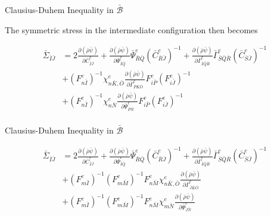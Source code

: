 \documentclass[11pt]{beamer}
\begin{document}
\begin{frame}{Clausius-Duhem Inequality in $\bar{\mathcal{B}}$}

The symmetric stress in the intermediate configuration then becomes

\begin{align*}
\bar{\Sigma}_{\bar{I}\bar{J}} &= 2\frac{\partial\left(\bar{\rho}\bar{\psi}\right)}{\partial \bar{C}_{\bar{I}\bar{J}}^e} + \frac{\partial\left(\bar{\rho}\bar{\psi}\right)}{\partial \bar{\Psi}_{\bar{I}\bar{Q}}^e}\bar{\Psi}_{\bar{R}\bar{Q}}^e \left(\bar{C}_{\bar{R}\bar{J}}^e\right)^{-1} + \frac{\partial\left(\bar{\rho}\bar{\psi}\right)}{\partial \bar{\Gamma}_{\bar{I}\bar{Q}\bar{R}}^e} \bar{\Gamma}_{\bar{S}\bar{Q}\bar{R}}^e \left(\bar{C}_{\bar{S}\bar{J}}^e\right)^{-1}\\
&  + \left(F_{n\bar{I}}^e\right)^{-1} \chi_{n\bar{K},\bar{O}}^e \frac{\partial \left(\bar{\rho}\bar{\psi}\right)}{\partial \bar{\Gamma}_{\bar{P}\bar{K}\bar{O}}^e} F_{i\bar{P}}^e \left(F_{i\bar{J}}^e\right)^{-1}\\
&+ \left(F_{n\bar{I}}^e\right)^{-1} \chi_{n\bar{N}}^e \frac{ \partial \left(\bar{\rho}\bar{\psi}\right)}{\partial \bar{\Psi}_{\bar{P}\bar{N}}^e} F_{i\bar{P}}^e \left(F_{i\bar{J}}^e\right)^{-1}\\
\end{align*}

\end{frame}

\begin{frame}{Clausius-Duhem Inequality in $\bar{\mathcal{B}}$}

\begin{align*}
\bar{\Sigma}_{\bar{I}\bar{J}} &= 2\frac{\partial\left(\bar{\rho}\bar{\psi}\right)}{\partial \bar{C}_{\bar{I}\bar{J}}^e} + \frac{\partial\left(\bar{\rho}\bar{\psi}\right)}{\partial \bar{\Psi}_{\bar{I}\bar{Q}}^e}\bar{\Psi}_{\bar{R}\bar{Q}}^e \left(\bar{C}_{\bar{R}\bar{J}}^e\right)^{-1} + \frac{\partial\left(\bar{\rho}\bar{\psi}\right)}{\partial \bar{\Gamma}_{\bar{I}\bar{Q}\bar{R}}^e} \bar{\Gamma}_{\bar{S}\bar{Q}\bar{R}}^e \left(\bar{C}_{\bar{S}\bar{J}}^e\right)^{-1}\\
&  + \left(F_{m\bar{I}}^e\right)^{-1} \left(F_{m\bar{M}}^e\right)^{-1} F_{n\bar{M}}^e\chi_{n\bar{K},\bar{O}}^e \frac{\partial \left(\bar{\rho}\bar{\psi}\right)}{\partial \bar{\Gamma}_{\bar{J}\bar{K}\bar{O}}^e}\\
&+ \left(F_{m\bar{I}}^e\right)^{-1}  \left(F_{m\bar{M}}^e\right)^{-1} F_{n\bar{M}}^e \chi_{m\bar{N}}^e \frac{ \partial \left(\bar{\rho}\bar{\psi}\right)}{\partial \bar{\Psi}_{\bar{J}\bar{N}}^e} \\
\end{align*}

\end{frame}
\end{document}
